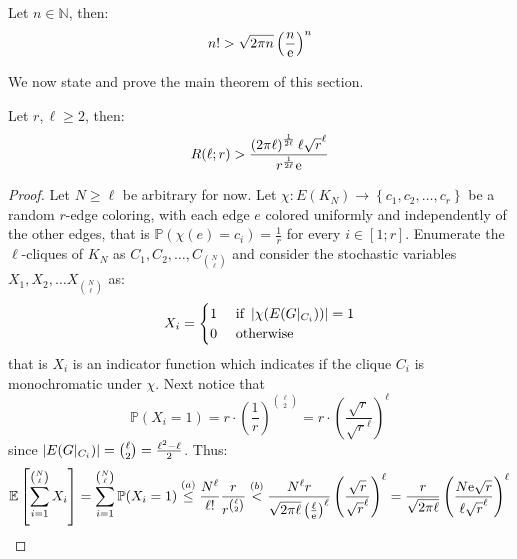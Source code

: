 \begin{lemma}\label{lem:stirling}
	Let $n \in \mathbb{N}$, then:
	\begin{equation*}
		n! > \sqrt{2 \pi n} \left(\frac{n}{\textnormal{e}}\right)^{n}
	\end{equation*}
\end{lemma}
We now state and prove the main theorem of this section.
\begin{theorem}
	Let $r, \ell \geq 2$, then:
	\begin{equation*}
		R(\ell; r) > \frac{\left(2\pi \ell\right)^{\frac{1}{2\ell}}\ell \sqrt{r}^{\ell}}{r^{\frac{1}{2\ell}}\textnormal{e}}
	\end{equation*}
\end{theorem}
\begin{proof}
	Let $N \geq \ell$ be arbitrary for now. Let $\chi: E(K_N) \to \left\{c_1, c_2, \ldots, c_{r}\right\}$ be a random $r$-edge coloring, with each edge $e$ colored uniformly and independently of the other edges, that is $\mathbb{P}(\chi(e) = c_{i}) = \frac{1}{r}$ for every $i \in [1; r]$. Enumerate the $\ell$-cliques of $K_{N}$ as $C_1, C_2, \ldots, C_{\binom{N}{\ell}}$ and consider the stochastic variables $X_1, X_2, \ldots X_{\binom{N}{\ell}}$ as:
	\begin{equation*}
		X_i = \begin{cases}
			1 & \text{ if } \left\lvert\chi(E(G \vert_{C_i}))\right\rvert = 1 \\
			0 & \text{ otherwise }
		\end{cases}
	\end{equation*}
	that is $X_i$ is an indicator function which indicates if the clique $C_i$ is monochromatic under $\chi$. Next notice that
	\begin{equation}\label{eq:prop_mon_clique}
		\mathbb{P}(X_i = 1) = r \cdot \left(\frac{1}{r}\right)^{\binom{\ell}{2}} = r \cdot \left(\frac{\sqrt{r}}{\sqrt{r}^{\ell}}\right)^\ell
	\end{equation}
	since $\left\lvert E(G \vert_{C_i})\right\rvert = \binom{\ell}{2} = \frac{\ell^2 - \ell}{2}$. Thus:
	\begin{equation}\label{eq:prob_method}
		\mathbb{E} \left[\sum_{i = 1}^{\binom{N}{\ell}} X_{i}\right]
		= \sum_{i = 1}^{\binom{N}{\ell}} \mathbb{P}(X_i = 1)
		\stackrel{(a)}{\leq} \frac{N^{\ell}}{\ell!} \frac{r}{r^{\binom{\ell}{2}}}
		\stackrel{(b)}{<} \frac{N^{\ell}r}{\sqrt{2\pi \ell} \left(\frac{\ell}{\e}\right)^{\ell}}   \left(\frac{\sqrt{r}}{\sqrt{r}^{\ell}}\right)^{\ell}
		= \frac{r}{\sqrt{2\pi\ell}} \left(\frac{N \e \sqrt{r}}{\ell \sqrt{r}^{\ell}}\right)^{\ell}

\end{equation}
\end{proof}
